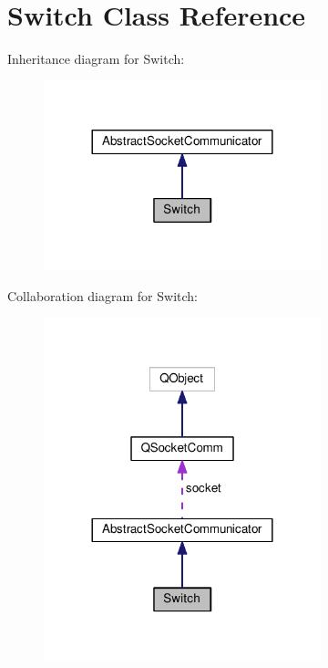 \hypertarget{class_switch}{}\section{Switch Class Reference}
\label{class_switch}


Inheritance diagram for Switch\+:
\nopagebreak
\begin{figure}[H]
\begin{center}
\leavevmode
\includegraphics[width=228pt]{class_switch__inherit__graph}
\end{center}
\end{figure}


Collaboration diagram for Switch\+:
\nopagebreak
\begin{figure}[H]
\begin{center}
\leavevmode
\includegraphics[width=228pt]{class_switch__coll__graph}
\end{center}
\end{figure}
